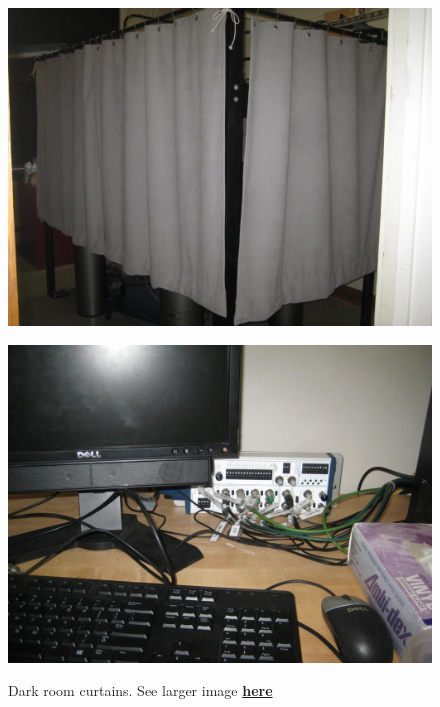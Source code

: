 \documentclass{../lab}
\begin{document}
\begin{figure}[H]
\captionsetup{justification=centering}
\begin{minipage}[t]{0.40\textwidth}
    \href{http://experimentationlab.berkeley.edu/sites/default/files/IMG\_4080.JPG}{\includegraphics[width=\linewidth,keepaspectratio]{images/IMG_4080.JPG}}
    \caption{Dark room curtains. See larger image \href{http://experimentationlab.berkeley.edu/sites/default/files/IMG\_4080.JPG}{\textbf{here}}}
\end{minipage}
\begin{minipage}[t]{0.40\textwidth}
    \href{http://experimentationlab.berkeley.edu/sites/default/files/IMG\_4081.JPG}{\includegraphics[width=\linewidth,keepaspectratio]{images/IMG_4081.JPG}}

\end{minipage}
\end{figure}
\end{document}
